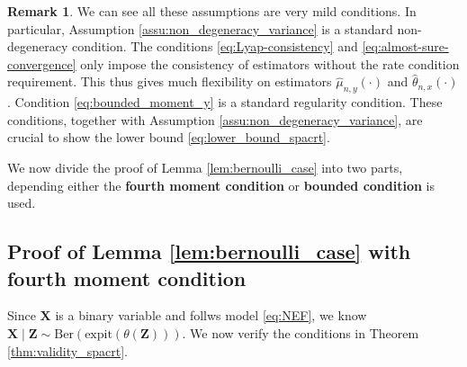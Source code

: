 \documentclass[12pt]{article}
\theoremstyle{definition}
\newtheorem{remark}{Remark}
\newcommand{\expit}{\mathrm{expit}}                 	%
\newcommand{\prx}{\bm X}								%
\newcommand{\prz}{\bm Z}								%
\begin{document}
\begin{remark}
  We can see all these assumptions are very mild conditions. In particular, Assumption \ref{assu:non_degeneracy_variance} is a standard non-degeneracy condition. The conditions \eqref{eq:Lyap-consistency} and \eqref{eq:almost-sure-convergence} only impose the consistency of estimators without the rate condition requirement. This thus gives much flexibility on estimators $\widehat{\mu}_{n,y}(\cdot)$ and $\widehat{\theta}_{n,x}(\cdot)$. Condition \eqref{eq:bounded_moment_y} is a standard regularity condition. These conditions, together with Assumption \ref{assu:non_degeneracy_variance}, are crucial to show the lower bound \eqref{eq:lower_bound_spacrt}.
\end{remark}

We now divide the proof of Lemma \ref{lem:bernoulli_case} into two parts, depending either the \textbf{fourth moment condition} or \textbf{bounded condition} is used.


\subsection{Proof of Lemma \ref{lem:bernoulli_case} with fourth moment condition}

Since $\prx$ is a binary variable and follws model \eqref{eq:NEF}, we know $\prx\mid\prz \sim \mathrm{Ber}(\expit(\theta(\prz)))$. We now verify the conditions in Theorem \ref{thm:validity_spacrt}.
\end{document}
